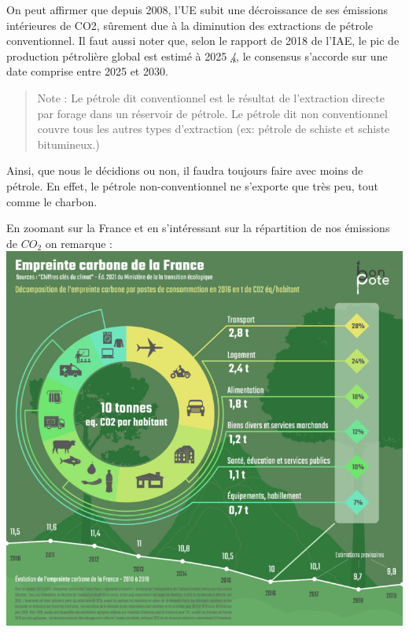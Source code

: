 On peut affirmer que depuis 2008, l'UE subit une décroissance de ses
émissions intérieures de CO2, sûrement due à la diminution des
extractions de pétrole conventionnel. Il faut aussi noter que, selon le
rapport de 2018 de l'IAE, le pic de production pétrolière global est
estimé à 2025
\emph{\href{https://www.lemonde.fr/blog/petrole/2019/02/04/pic-petrolier-probable-dici-a-2025-selon-lagence-internationale-de-lenergie/}{4}},
le consensus s'accorde sur une date comprise entre 2025 et 2030.

\begin{quote}
Note : Le pétrole dit conventionnel est le résultat de l'extraction
directe par forage dans un réservoir de pétrole. Le pétrole dit non
conventionnel couvre tous les autres types d'extraction (ex: pétrole de
schiste et schiste bitumineux.)
\end{quote}

Ainsi, que nous le décidions ou non, il faudra toujours faire avec moins
de pétrole. En effet, le pétrole non-conventionnel ne s'exporte que très
peu, tout comme le charbon.

En zoomant sur la France et en s'intéressant sur la répartition de nos
émissions de \(CO_2\) on remarque :\\
\includegraphics{img/1.Empreinte-carbone-1-768x725.jpg}

